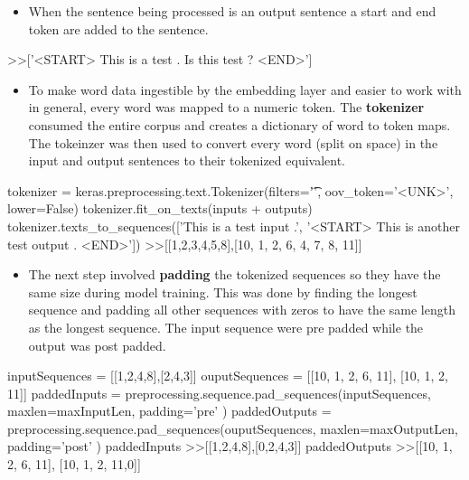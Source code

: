 \documentclass[12pt]{article}
\begin{document}
\begin{itemize}
    \item When the sentence being processed is an output sentence a start and end token are added to the sentence.
\end{itemize}
\begin{python}
    >>['<START> This is a test . Is this test ? <END>']
\end{python}
\begin{itemize}
    \item To make word data ingestible by the embedding layer and easier to work with in general, every word was mapped to a numeric token. The \textbf{tokenizer} consumed the entire corpus and creates a dictionary of word to token maps. The tokeinzer was then used to convert every word (split on space) in the input and output sentences to their tokenized equivalent.
\end{itemize}
\begin{python}
    tokenizer = keras.preprocessing.text.Tokenizer(filters='\t\n',
                                                   oov_token='<UNK>', 
                                                   lower=False)
    tokenizer.fit_on_texts(inputs + outputs)
    tokenizer.texts_to_sequences(['This is a test input .',
                        '<START> This is another test output . <END>'])
    >>[[1,2,3,4,5,8],[10, 1, 2, 6, 4, 7, 8, 11]]
\end{python}
\begin{itemize}
    \item The next step involved \textbf{padding} the tokenized sequences so they have the same size during model training. This was done by finding the longest sequence and padding all other sequences with zeros to have the same length as the longest sequence. The input sequence were pre padded while the output was post padded.
\end{itemize}
\begin{python}
    inputSequences = [[1,2,4,8],[2,4,3]]
    ouputSequences = [[10, 1, 2, 6, 11], [10, 1, 2, 11]]
    paddedInputs = preprocessing.sequence.pad_sequences(inputSequences,
                                                     maxlen=maxInputLen,
                                                     padding='pre' )
    paddedOutputs = preprocessing.sequence.pad_sequences(ouputSequences,
                                                     maxlen=maxOutputLen,
                                                     padding='post' )
    paddedInputs
    >>[[1,2,4,8],[0,2,4,3]]
    paddedOutputs
    >>[[10, 1, 2, 6, 11], [10, 1, 2, 11,0]]
\end{python}
\end{document}
